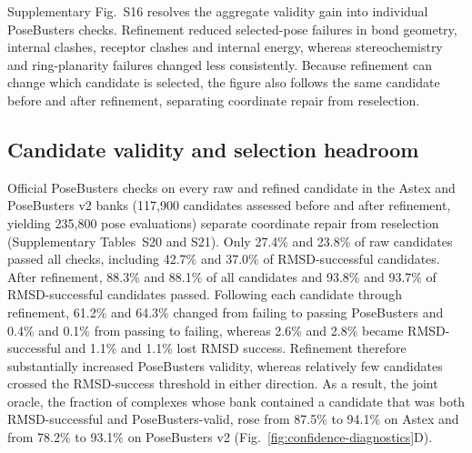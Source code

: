 \documentclass{article}
\begin{document}
Supplementary Fig.~S16 resolves the aggregate validity gain into individual PoseBusters checks.
Refinement reduced selected-pose failures in bond geometry, internal clashes, receptor clashes and internal energy, whereas stereochemistry and ring-planarity failures changed less consistently.
Because refinement can change which candidate is selected, the figure also follows the same candidate before and after refinement, separating coordinate repair from reselection.

\FloatBarrier

\subsection{Candidate validity and selection headroom}

Official PoseBusters checks on every raw and refined candidate in the Astex and PoseBusters v2 banks (117,900 candidates assessed before and after refinement, yielding 235,800 pose evaluations) separate coordinate repair from reselection (Supplementary Tables~S20 and S21). Only 27.4\% and 23.8\% of raw candidates passed all checks, including 42.7\% and 37.0\% of RMSD-successful candidates. After refinement, 88.3\% and 88.1\% of all candidates and 93.8\% and 93.7\% of RMSD-successful candidates passed. Following each candidate through refinement, 61.2\% and 64.3\% changed from failing to passing PoseBusters and 0.4\% and 0.1\% from passing to failing, whereas 2.6\% and 2.8\% became RMSD-successful and 1.1\% and 1.1\% lost RMSD success. Refinement therefore substantially increased PoseBusters validity, whereas relatively few candidates crossed the RMSD-success threshold in either direction. As a result, the joint oracle, the fraction of complexes whose bank contained a candidate that was both RMSD-successful and PoseBusters-valid, rose from 87.5\% to 94.1\% on Astex and from 78.2\% to 93.1\% on PoseBusters v2 (Fig.~\ref{fig:confidence-diagnostics}D).
\end{document}
